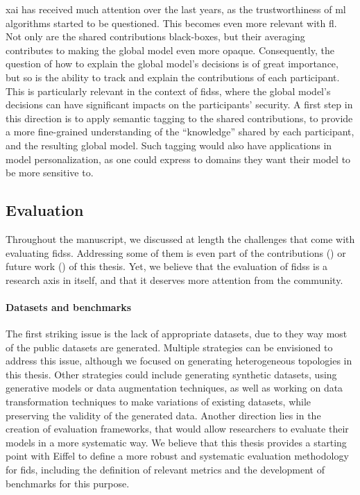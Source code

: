 \Gls{xai} has received much attention over the last years, as the trustworthiness of \gls{ml} algorithms started to be questioned.
This becomes even more relevant with \gls{fl}.
Not only are the shared contributions black-boxes, but their averaging contributes to making the global model even more opaque.
Consequently, the question of how to explain the global model's decisions is of great importance, but so is the ability to track and explain the contributions of each participant.
This is particularly relevant in the context of \glspl{fids}, where the global model's decisions can have significant impacts on the participants' security.
A first step in this direction is to apply semantic tagging to the shared contributions, to provide a more fine-grained understanding of the ``knowledge'' shared by each participant, and the resulting global model.
Such tagging would also have applications in model personalization, as one could express to domains they want their model to be more sensitive to.


\subsection{Evaluation\label{sec:conclusion.perspectives.eval}}


Throughout the manuscript, we discussed at length the challenges that come with evaluating \glspl{fids}.
Addressing some of them is even part of the contributions (\cf {}) or future work () of this thesis.
Yet, we believe that the evaluation of \glspl{fids} is a research axis in itself, and that it deserves more attention from the community.

\paragraph{Datasets and benchmarks}

The first striking issue is the lack of appropriate datasets, due to they way most of the public datasets are generated.
Multiple strategies can be envisioned to address this issue, although we focused on generating heterogeneous topologies in this thesis.
Other strategies could include generating synthetic datasets, using generative models or data augmentation techniques, as well as working on data transformation techniques to make variations of existing datasets, while preserving the validity of the generated data.
Another direction lies in the creation of evaluation frameworks, that would allow researchers to evaluate their models in a more systematic way.
We believe that this thesis provides a starting point with Eiffel to define a more robust and systematic evaluation methodology for \gls{fids}, including the definition of relevant metrics and the development of benchmarks for this purpose.

